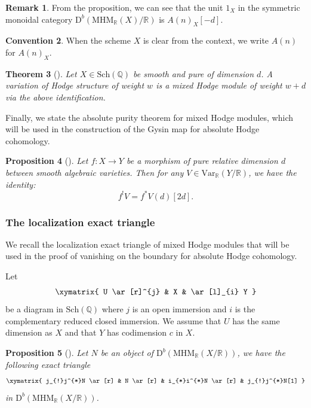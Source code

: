 \documentclass[11pt, a4paper]{amsart}
\theoremstyle{plain}
\newtheorem{theorem}{Theorem}[section]
\newtheorem{proposition}[theorem]{Proposition}
\theoremstyle{definition}
\newtheorem{remark}[theorem]{Remark}
\newtheorem{convention}[theorem]{Convention}
\numberwithin{equation}{section}
\def\QQ{\mathbb{Q}}
\def\RR{\mathbb{R}}
\begin{document}
\begin{remark}
    From the proposition, we can see that the unit $1_{X}$ in the symmetric monoidal category $\mathrm{D}^{b}(\mathrm{MHM}_{\RR}(X)/\RR)$ is ${A(n)_{X}}[-d]$. 
\end{remark}

\begin{convention}
    When the scheme $X$ is clear from the context, we write $A(n)$ for $A(n)_{X}$.  
\end{convention}

\begin{theorem}[{\cite[Theorem 2]{Saito88}}]
 Let $X \in \mathrm{Sch}(\QQ)$ be smooth and pure of dimension $d$. A variation of Hodge structure of weight $w$ is a mixed Hodge module of weight $w + d$ via the above identification. 
\end{theorem}

Finally, we state the absolute purity theorem for mixed Hodge modules, which will be used in the construction of the Gysin map for absolute Hodge cohomology.

\begin{proposition}[{\cite[Proposition 2.3.16]{Bl06}}]
\label{Prop: absolute purity for MHM}
    Let $f\colon X \rightarrow Y$ be a morphism of pure relative dimension $d$ between smooth algebraic varieties. Then for any $V \in \mathrm{Var}_{\RR}(Y/\RR)$, we have the identity: 
    \begin{equation*}
        f^{!}V = f^{*}V(d)[2d]. 
    \end{equation*}
\end{proposition}

\subsubsection{The localization exact triangle} We recall the localization exact triangle of mixed Hodge modules that will be used in the proof of vanishing on the boundary for absolute Hodge cohomology. 

\par Let 
\begin{equation*}
    \xymatrix{
        U \ar[r]^{j} & X & \ar[l]_{i} Y 
    }
\end{equation*}
be a diagram in $\mathrm{Sch}(\QQ)$ where $j$ is an open immersion and $i$ is the complementary reduced closed immersion. We assume that $U$ has the same dimension as $X$ and that $Y$ has codimension $c$ in $X$. 

\begin{proposition}[{\cite[(4.4.1)]{MHM90}}]
\label{Prop: MHM localization}
    Let $N$ be an object of $\mathrm{D}^{b}(\mathrm{MHM}_{\RR}(X/\RR))$, we have the following exact triangle
    \begin{equation*}
        \xymatrix{
            j_{!}j^{*}N \ar[r] & N \ar[r] & i_{*}i^{*}N \ar[r] & j_{!}j^{*}N[1]
        }
    \end{equation*}
    in $\mathrm{D}^{b}(\mathrm{MHM}_{\RR}(X/\RR))$. 
\end{proposition}
\end{document}
